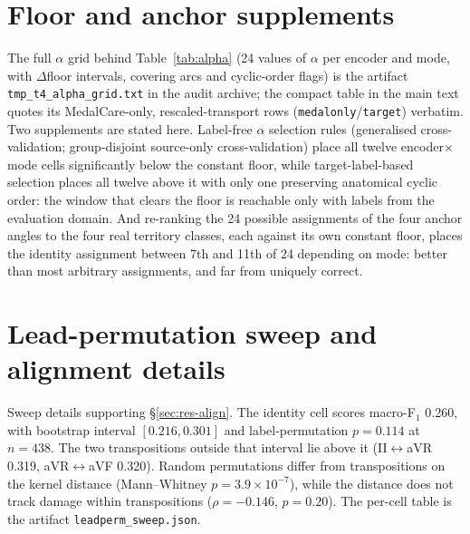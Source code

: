 \section{Floor and anchor supplements}
\label{app:floors}

The full $\alpha$ grid behind Table~\ref{tab:alpha} (24 values of $\alpha$ per encoder and mode, with $\Delta$floor intervals, covering arcs and cyclic-order flags) is the artifact \texttt{tmp\_t4\_alpha\_grid.txt} in the audit archive; the compact table in the main text quotes its MedalCare-only, rescaled-transport rows (\texttt{medalonly}/\texttt{target}) verbatim. Two supplements are stated here. Label-free $\alpha$ selection rules (generalised cross-validation; group-disjoint source-only cross-validation) place all twelve encoder$\times$mode cells significantly below the constant floor, while target-label-based selection places all twelve above it with only one preserving anatomical cyclic order: the window that clears the floor is reachable only with labels from the evaluation domain. And re-ranking the 24 possible assignments of the four anchor angles to the four real territory classes, each against its own constant floor, places the identity assignment between 7th and 11th of 24 depending on mode: better than most arbitrary assignments, and far from uniquely correct. 

\section[Sweep and alignment details]{Lead-permutation sweep and alignment details}
\label{app:sweep}

Sweep details supporting \S\ref{sec:res-align}. The identity cell scores macro-F$_1$ 0.260, with bootstrap interval $[0.216, 0.301]$ and label-permutation $p=0.114$ at $n=438$. The two transpositions outside that interval lie above it (II$\leftrightarrow$aVR 0.319, aVR$\leftrightarrow$aVF 0.320). Random permutations differ from transpositions on the kernel distance (Mann--Whitney $p=3.9\times10^{-7}$), while the distance does not track damage within transpositions ($\rho=-0.146$, $p=0.20$). The per-cell table is the artifact \texttt{leadperm\_sweep.json}. 

